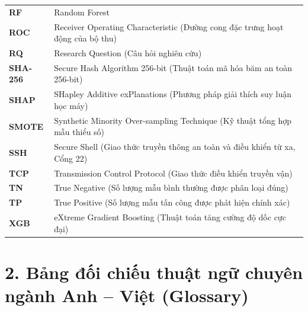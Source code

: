 \begin{longtable}{lp{11.5cm}}
\textbf{RF} & Random Forest \\
\textbf{ROC} & Receiver Operating Characteristic (Đường cong đặc trưng hoạt động của bộ thu) \\
\textbf{RQ} & Research Question (Câu hỏi nghiên cứu) \\
\textbf{SHA-256} & Secure Hash Algorithm 256-bit (Thuật toán mã hóa băm an toàn 256-bit) \\
\textbf{SHAP} & SHapley Additive exPlanations (Phương pháp giải thích suy luận học máy) \\
\textbf{SMOTE} & Synthetic Minority Over-sampling Technique (Kỹ thuật tổng hợp mẫu thiểu số) \\
\textbf{SSH} & Secure Shell (Giao thức truyền thông an toàn và điều khiển từ xa, Cổng 22) \\
\textbf{TCP} & Transmission Control Protocol (Giao thức điều khiển truyền vận) \\
\textbf{TN} & True Negative (Số lượng mẫu bình thường được phân loại đúng) \\
\textbf{TP} & True Positive (Số lượng mẫu tấn công được phát hiện chính xác) \\
\textbf{XGB} & eXtreme Gradient Boosting (Thuật toán tăng cường độ dốc cực đại) \\
\end{longtable}

\vspace{0.2cm}

\section*{2. Bảng đối chiếu thuật ngữ chuyên ngành Anh -- Việt (Glossary)}

